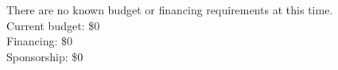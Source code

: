 There are no known budget or financing requirements at this time.\\
Current budget: \$0\\
Financing: \$0\\
Sponsorship: \$0\\
